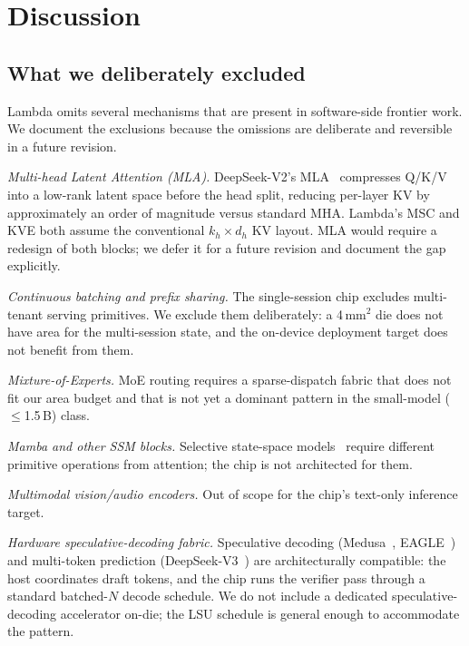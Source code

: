\documentclass[conference]{IEEEtran}
\begin{document}
\section{Discussion}
\label{sec:discussion}

\subsection{What we deliberately excluded}

Lambda omits several mechanisms that are present in software-side frontier work. We document the exclusions because the omissions are deliberate and reversible in a future revision.

\textit{Multi-head Latent Attention (MLA).} DeepSeek-V2's MLA~\cite{mla} compresses Q/K/V into a low-rank latent space before the head split, reducing per-layer KV by approximately an order of magnitude versus standard MHA. Lambda's MSC and KVE both assume the conventional $k_h \times d_h$ KV layout. MLA would require a redesign of both blocks; we defer it for a future revision and document the gap explicitly.

\textit{Continuous batching and prefix sharing.} The single-session chip excludes multi-tenant serving primitives. We exclude them deliberately: a 4\,mm$^2$ die does not have area for the multi-session state, and the on-device deployment target does not benefit from them.

\textit{Mixture-of-Experts.} MoE routing requires a sparse-dispatch fabric that does not fit our area budget and that is not yet a dominant pattern in the small-model ($\leq$1.5\,B) class.

\textit{Mamba and other SSM blocks.} Selective state-space models~\cite{mamba} require different primitive operations from attention; the chip is not architected for them.

\textit{Multimodal vision/audio encoders.} Out of scope for the chip's text-only inference target.

\textit{Hardware speculative-decoding fabric.} Speculative decoding (Medusa~\cite{medusa}, EAGLE~\cite{eagle}) and multi-token prediction (DeepSeek-V3~\cite{deepseek_v3}) are architecturally compatible: the host coordinates draft tokens, and the chip runs the verifier pass through a standard batched-$N$ decode schedule. We do not include a dedicated speculative-decoding accelerator on-die; the LSU schedule is general enough to accommodate the pattern.
\end{document}
